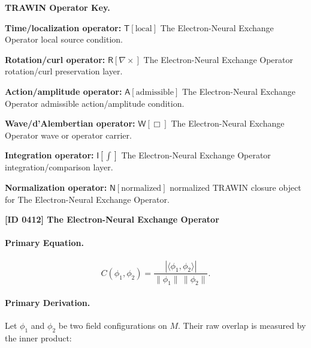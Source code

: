 \par\vspace{0.45\baselineskip}
\noindent\begin{minipage}[t]{\linewidth}
\begingroup
\small
\raggedright
\textbf{TRAWIN Operator Key.}\par
\noindent\textbf{Time/localization operator:} $\mathsf{T}\!\left[\mathrm{local}\right]$ The Electron-Neural Exchange Operator local source condition.\par
\noindent\textbf{Rotation/curl operator:} $\mathsf{R}\!\left[\nabla\times\right]$ The Electron-Neural Exchange Operator rotation/curl preservation layer.\par
\noindent\textbf{Action/amplitude operator:} $\mathsf{A}\!\left[\mathrm{admissible}\right]$ The Electron-Neural Exchange Operator admissible action/amplitude condition.\par
\noindent\textbf{Wave/d'Alembertian operator:} $\mathsf{W}\!\left[\Box\right]$ The Electron-Neural Exchange Operator wave or operator carrier.\par
\noindent\textbf{Integration operator:} $\mathsf{I}\!\left[\int\right]$ The Electron-Neural Exchange Operator integration/comparison layer.\par
\noindent\textbf{Normalization operator:} $\mathsf{N}\!\left[\mathrm{normalized}\right]$ normalized TRAWIN closure object for The Electron-Neural Exchange Operator.\par
\endgroup
\end{minipage}

\clearpage
\noindent\textbf{[ID 0412] The Electron-Neural Exchange Operator}\par
\vspace{0.35em}
\paragraph{Primary Equation.}
\begin{equation}
C(\phi_1,\phi_2)
=
\frac{
\left|\langle \phi_1,\phi_2\rangle\right|
}{
\lVert \phi_1\rVert\,\lVert \phi_2\rVert
}.
\end{equation}

\paragraph{Primary Derivation.}
Let $\phi_1$ and $\phi_2$ be two field configurations on $M$.  
Their raw overlap is measured by the inner product:

